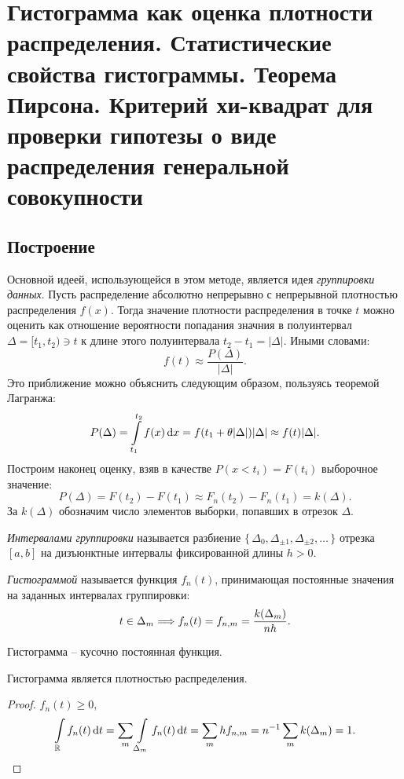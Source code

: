 \section{Гистограмма как оценка плотности распределения. Статистические 
    свойства гистограммы. Теорема Пирсона. Критерий хи-квадрат для проверки 
гипотезы о виде распределения генеральной совокупности}

\subsection{Построение}
Основной идеей, использующейся в этом методе, является идея \textit{группировки
данных}. Пусть распределение абсолютно непрерывно с непрерывной плотностью
распределения $f(x)$. Тогда значение плотности распределения в точке $t$ 
можно оценить как отношение вероятности попадания значния в полуинтервал
$\Delta = [t_1, t_2) \ni t$ к длине этого полуинтервала $t_2 - t_1 = |\Delta|$.
Иными словами:
\[
    f(t) \approx \frac{P(\Delta)}{|\Delta|}
.\]
Это приближение можно объяснить следующим образом, пользуясь теоремой Лагранжа:
\[
    P(\Delta) = \int\limits_{t_1}^{t_2}{f(x) \,\mathrm{d} x} = f(t_1 + \theta |\Delta|) |\Delta| 
    \approx f(t) |\Delta|
.\]
Построим наконец оценку, взяв в качестве $P(x < t_i) = F(t_i)$ 
выборочное значение:
\[
    P(\Delta) = F(t_2) - F(t_1) \approx F_n(t_2) - F_n(t_1) = k(\Delta)
.\]
За $k(\Delta)$ обозначим число элементов выборки, попавших в отрезок $\Delta$.

\begin{definition}
    \textit{Интервалами группировки} называется разбиение 
    $\{\,\Delta_0, \Delta_{\pm 1}, \Delta_{\pm 2}, \ldots\,\}$ отрезка 
    $[a, b]$ на дизъюнктные интервалы фиксированной длины $h > 0$.
\end{definition}

\begin{definition}
    \textit{Гистограммой} называется функция $f_n(t)$, принимающая
    постоянные значения на заданных интервалах группировки:
    \[
        t \in \Delta_m \Longrightarrow f_{n}(t) = f_{n, m} = \frac{k(\Delta_m)}{nh}
    .\]
\end{definition}

\begin{remark}
    Гистограмма -- кусочно постоянная функция.
\end{remark}

\begin{theorem}
    Гистограмма является плотностью распределения.
\end{theorem}
\begin{proof}
    $f_n(t) \geqslant 0$,
    \[
        \int\limits_{\mathbb{R}}{f_n(t) \,\mathrm{d} t} = \sum_{m}{\int\limits_{\Delta_m}{f_{n}(t) \,\mathrm{d} t}} =
        \sum_{m}{h f_{n, m}} = n^{-1} \sum_m{k(\Delta_m)} = 1
    .\]
\end{proof}

